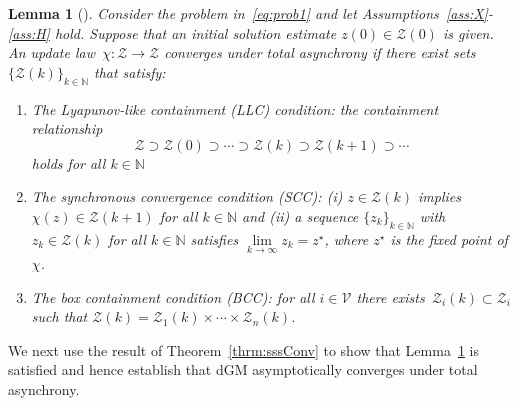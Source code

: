 \documentclass[9pt,shortpaper,twoside,web]{ieeecolor}
\newcommand{\Z}{\ensuremath{\mathcal{Z}}\xspace}
\newcommand{\V}{\ensuremath{\mathcal{V}}\xspace}
\newcommand{\blue}[1]{{\textcolor{blue}{#1}}}
\newtheorem{lemma}{Lemma}
\begin{document}
\begin{lemma}[\cite{bertsekas1989parallel}] \label{lem:threepart}
    Consider the problem in~\eqref{eq:prob1} and let Assumptions~\ref{ass:X}-\ref{ass:H} hold.
    Suppose that an initial solution estimate $z(0)\in\Z(0)$ is given.
    An update law~$\chi : \Z \to \Z$ converges under total asynchrony
    if there exist sets~$\{\Z(k)\}_{k \in \mathbb{N}}$ that satisfy: 
    \begin{enumerate}
        \item 
        The Lyapunov-like containment (LLC) condition: the containment relationship
        \begin{equation}
            \Z \supset \Z(0)\supset \cdots \supset\Z(k) \supset\Z(k+1)\supset \cdots
        \end{equation}
        holds for all $k\in\mathbb N$
        \item The synchronous convergence condition (SCC): 
        (i) $z\in\Z(k)$ implies $\chi(z)\in \Z(k+1)$ for all $k\in\mathbb N$ and (ii) a sequence $\{z_k\}_{k\in\mathbb N}$ with $z_k\in\Z(k)$ for all $k\in\mathbb N$ satisfies $\lim\limits_{k\rightarrow \infty}z_k=z^\star$, where $z^\star$ is the fixed point of $\chi$.
        \item The box containment condition (BCC): for all $i\in\V$ there exists~$\Z_i(k)\subset \Z_i$ such that $\Z(k)=\Z_1(k)\times \cdots \times \Z_n(k)$.
    \end{enumerate}
\end{lemma}

We next use the result of Theorem~\ref{thrm:sssConv} to 
show that Lemma~\ref{lem:threepart} is satisfied and hence
establish that dGM asymptotically converges under
total asynchrony. 
\end{document}
